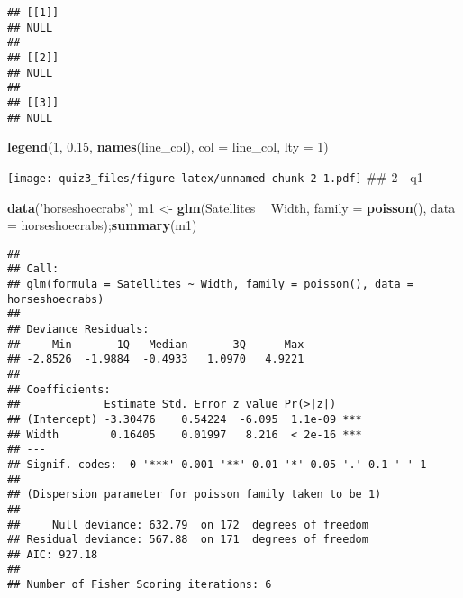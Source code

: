 \documentclass[12pt,hyperref,]{ctexart}
\newenvironment{Shaded}{\begin{snugshade}}{\end{snugshade}}
\newcommand{\DataTypeTok}[1]{\textcolor[rgb]{0.13,0.29,0.53}{#1}}
\newcommand{\DecValTok}[1]{\textcolor[rgb]{0.00,0.00,0.81}{#1}}
\newcommand{\FloatTok}[1]{\textcolor[rgb]{0.00,0.00,0.81}{#1}}
\newcommand{\KeywordTok}[1]{\textcolor[rgb]{0.13,0.29,0.53}{\textbf{#1}}}
\newcommand{\NormalTok}[1]{#1}
\newcommand{\OperatorTok}[1]{\textcolor[rgb]{0.81,0.36,0.00}{\textbf{#1}}}
\newcommand{\StringTok}[1]{\textcolor[rgb]{0.31,0.60,0.02}{#1}}
\begin{document}
\begin{verbatim}
## [[1]]
## NULL
## 
## [[2]]
## NULL
## 
## [[3]]
## NULL
\end{verbatim}

\begin{Shaded}
\begin{Highlighting}[]
\KeywordTok{legend}\NormalTok{(}\DecValTok{1}\NormalTok{, }\FloatTok{0.15}\NormalTok{, }\KeywordTok{names}\NormalTok{(line_col), }\DataTypeTok{col =}\NormalTok{ line_col, }\DataTypeTok{lty =} \DecValTok{1}\NormalTok{)}
\end{Highlighting}
\end{Shaded}

\texttt{[image: quiz3\_files/figure-latex/unnamed-chunk-2-1.pdf]} \#\# 2
- q1

\begin{Shaded}
\begin{Highlighting}[]
\KeywordTok{data}\NormalTok{(}\StringTok{'horseshoecrabs'}\NormalTok{)}
\NormalTok{m1 <-}\StringTok{ }\KeywordTok{glm}\NormalTok{(Satellites }\OperatorTok{~}\StringTok{ }\NormalTok{Width, }\DataTypeTok{family =} \KeywordTok{poisson}\NormalTok{(), }\DataTypeTok{data =}\NormalTok{ horseshoecrabs);}\KeywordTok{summary}\NormalTok{(m1)}
\end{Highlighting}
\end{Shaded}

\begin{verbatim}
## 
## Call:
## glm(formula = Satellites ~ Width, family = poisson(), data = horseshoecrabs)
## 
## Deviance Residuals: 
##     Min       1Q   Median       3Q      Max  
## -2.8526  -1.9884  -0.4933   1.0970   4.9221  
## 
## Coefficients:
##             Estimate Std. Error z value Pr(>|z|)    
## (Intercept) -3.30476    0.54224  -6.095  1.1e-09 ***
## Width        0.16405    0.01997   8.216  < 2e-16 ***
## ---
## Signif. codes:  0 '***' 0.001 '**' 0.01 '*' 0.05 '.' 0.1 ' ' 1
## 
## (Dispersion parameter for poisson family taken to be 1)
## 
##     Null deviance: 632.79  on 172  degrees of freedom
## Residual deviance: 567.88  on 171  degrees of freedom
## AIC: 927.18
## 
## Number of Fisher Scoring iterations: 6
\end{verbatim}
\end{document}
